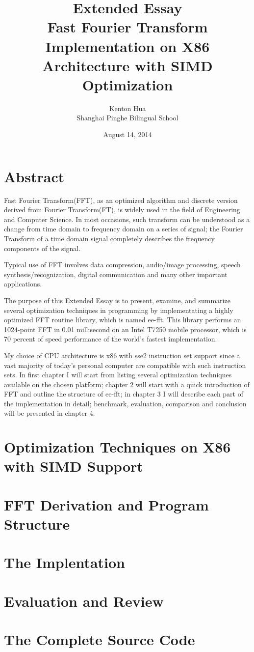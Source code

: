 \documentclass[a4paper]{report}
\begin{document}
\title{\Huge{Extended Essay} \\[2cm] \Large{Fast Fourier Transform Implementation on X86 Architecture with SIMD Optimization} \\[1cm]}
\author{Kenton Hua \\[0.5cm] Shanghai Pinghe Bilingual School}
\date{August 14, 2014}
\maketitle

\newpage

\chapter*{Abstract} \indent

	Fast Fourier Transform(FFT), as an optimized algorithm and discrete version derived from Fourier Transform(FT), is widely used in the field of Engineering and Computer Science. In most occasions, such transform can be understood as a change from time domain to frequency domain on a series of signal; the Fourier Transform of a time domain signal completely describes the frequency components of the signal.

	Typical use of FFT involves data compression, audio/image processing, speech synthesis/recognization, digital communication and many other important applications.
	
	The purpose of this Extended Essay is to present, examine, and summarize several optimization techniques in programming by implementating a highly optimized FFT routine library, which is named ee-fft. This library performs an 1024-point FFT in 0.01 millisecond on an Intel T7250 mobile processor, which is 70 percent of speed performance of the world's fastest implementation.

	My choice of CPU architecture is x86 with sse2 instruction set support since a vast majority of today's personal computer are compatible with such instruction sets. In first chapter I will start from listing several optimization techniques available on the chosen platform; chapter 2 will start with a quick introduction of FFT and outline the structure of ee-fft; in chapter 3 I will describe each part of the implementation in detail; benchmark, evaluation, comparison and conclusion will be presented in chapter 4.

\newpage
\tableofcontents

\newpage

\chapter{Optimization Techniques on X86 with SIMD Support}
\chapter{FFT Derivation and Program Structure}
\chapter{The Implentation}
\chapter{Evaluation and Review}

\appendix
\chapter{The Complete Source Code}
\end{document}
